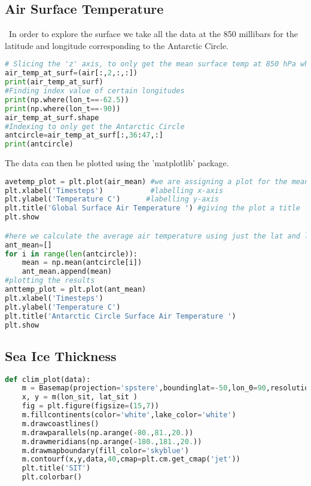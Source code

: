 \documentclass{article}
\begin{document}
\subsection{Air Surface Temperature}\
In order to explore the surface we take all the data at the 850 millibars for the latitude and longitude corresponding to the Antarctic Circle. 
\begin{lstlisting}[language=Python]
# Slicing the 'z' axis, to only get the mean surface temp at 850 hPa where most convergence occurs
air_temp_at_surf=(air[:,2,:,:])
print(air_temp_at_surf)
#Finding index value of certain longitudes
print(np.where(lon_t==-62.5))
print(np.where(lon_t==-90))
air_temp_at_surf.shape
#Indexing to only get the Antarctic Circle
antcircle=air_temp_at_surf[:,36:47,:]
print(antcircle)
\end{lstlisting}
The data can then be plotted using the 'matplotlib' package. 
\begin{lstlisting}[language=Python]
avetemp_plot = plt.plot(air_mean) #we are assigning a plot for the mean air temperature
plt.xlabel('Timesteps')           #labelling x-axis
plt.ylabel('Temperature C')      #labelling y-axis
plt.title('Global Surface Air Temperature ') #giving the plot a title
plt.show

#here we calculate the average air temperature using just the lat and lon of the Antarctic Circle
ant_mean=[]
for i in range(len(antcircle)):
    mean = np.mean(antcircle[i])
    ant_mean.append(mean)
#plotting the results
anttemp_plot = plt.plot(ant_mean)
plt.xlabel('Timesteps')
plt.ylabel('Temperature C')
plt.title('Antarctic Circle Surface Air Temperature ')
plt.show
\end{lstlisting}

\subsection{Sea Ice Thickness}
\begin{lstlisting}[language=Python]
def clim_plot(data):
    m = Basemap(projection='spstere',boundinglat=-50,lon_0=90,resolution='l')
    x, y = m(lon_sit, lat_sit )
    fig = plt.figure(figsize=(15,7))
    m.fillcontinents(color='white',lake_color='white')
    m.drawcoastlines()
    m.drawparallels(np.arange(-80.,81.,20.))
    m.drawmeridians(np.arange(-180.,181.,20.))
    m.drawmapboundary(fill_color='skyblue')
    m.contourf(x,y,data,40,cmap=plt.cm.get_cmap('jet'))
    plt.title('SIT')
    plt.colorbar()
\end{lstlisting}
\end{document}
